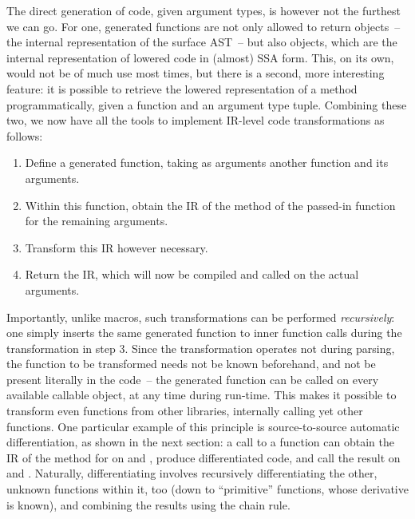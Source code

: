 The direct generation of code, given argument types, is however not the furthest we can go.  For
one, generated functions are not only allowed to return  objects~-- the internal
representation of the surface AST~-- but also  objects, which are the internal
representation of lowered code in (almost) SSA form.  This, on its own, would not be of much use
most times, but there is a second, more interesting feature: it is possible to retrieve the lowered
representation of a method programmatically, given a function and an argument type tuple.  Combining
these two, we now have all the tools to implement IR-level code transformations as follows:
\begin{enumerate}
  \firmlist
\item Define a generated function, taking as arguments another function and its arguments.
\item Within this function, obtain the IR of the method of the passed-in function for the remaining
  arguments.
\item Transform this IR however necessary.
\item Return the IR, which will now be compiled and called on the actual arguments.
\end{enumerate}
Importantly, unlike macros, such transformations can be performed \emph{recursively}: one simply
inserts the same generated function to inner function calls during the transformation in step 3.
Since the transformation operates not during parsing, the function to be transformed needs not be
known beforehand, and not be present literally in the code~-- the generated function can be called
on every available callable object, at any time during run-time.  This makes it possible to
transform even functions from other libraries, internally calling yet other functions.  One
particular example of this principle is source-to-source automatic differentiation, as shown in the
next section: a call to a function  can obtain the IR of the method for
 on  and , produce differentiated code, and call the
result on  and .  Naturally, differentiating  involves recursively
differentiating the other, unknown functions within it, too (down to \enquote{primitive} functions,
whose derivative is known), and combining the results using the chain rule.

